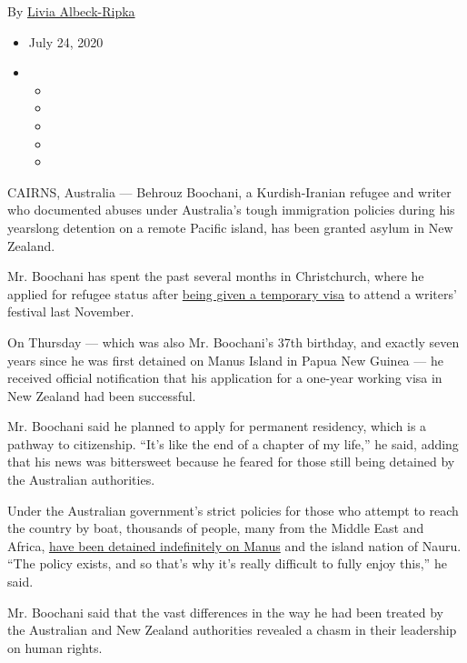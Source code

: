 By \href{https://www.nytimes.com/by/livia-albeck-ripka}{Livia
Albeck-Ripka}

\begin{itemize}
\item
  July 24, 2020
\item
  \begin{itemize}
  \item
  \item
  \item
  \item
  \item
  \end{itemize}
\end{itemize}

CAIRNS, Australia --- Behrouz Boochani, a Kurdish-Iranian refugee and
writer who documented abuses under Australia's tough immigration
policies during his yearslong detention on a remote Pacific island, has
been granted asylum in New Zealand.

Mr. Boochani has spent the past several months in Christchurch, where he
applied for refugee status after
\href{https://www.nytimes.com/2019/11/14/world/australia/behrouz-boochani-refugee.html}{being
given a temporary visa} to attend a writers' festival last November.

On Thursday --- which was also Mr. Boochani's 37th birthday, and exactly
seven years since he was first detained on Manus Island in Papua New
Guinea --- he received official notification that his application for a
one-year working visa in New Zealand had been successful.

Mr. Boochani said he planned to apply for permanent residency, which is
a pathway to citizenship. ``It's like the end of a chapter of my life,''
he said, adding that his news was bittersweet because he feared for
those still being detained by the Australian authorities.

Under the Australian government's strict policies for those who attempt
to reach the country by boat, thousands of people, many from the Middle
East and Africa,
\href{https://www.nytimes.com/interactive/2017/11/18/world/australia/manus-island-australia-detainees.html}{have
been detained indefinitely on Manus} and the island nation of Nauru.
``The policy exists, and so that's why it's really difficult to fully
enjoy this,'' he said.

Mr. Boochani said that the vast differences in the way he had been
treated by the Australian and New Zealand authorities revealed a chasm
in their leadership on human rights.

